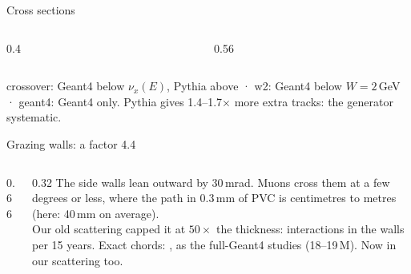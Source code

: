 \documentclass[aspectratio=169,10pt]{beamer}
\newcommand{\sld}[2][\linewidth]{\livewidget{#2}{#1}{0.62cm}}
\newcommand{\legendline}[1]{{\color{muted}\lightfont\scriptsize #1}}
\begin{document}
\begin{frame}{Cross sections}
  \\[1mm]
  \begin{columns}[c]
    \begin{column}{0.4\textwidth}\end{column}
    \begin{column}{0.56\textwidth}\end{column}
  \end{columns}
  \legendline{crossover: Geant4 below $\nu_x(E)$, Pythia above · w2: Geant4 below $W = 2$\,GeV · geant4: Geant4 only. Pythia gives 1.4--1.7$\times$ more extra tracks: the generator systematic.}
\end{frame}

\begin{frame}{Grazing walls: a factor 4.4}
  \begin{columns}[c]
    \begin{column}{0.66\textwidth}
      \\[1mm]
      \sld{sim_w_ang}
    \end{column}
    \begin{column}{0.32\textwidth}\footnotesize
      The side walls lean outward by 30\,mrad. Muons cross them at a few degrees or less, where the path in 0.3\,mm of PVC
      is centimetres to metres (here: 40\,mm on average).\\[1.5mm]
      Our old scattering capped it at $50\times$ the thickness:  interactions in the walls per 15 years. Exact chords:
      , as the full-Geant4 studies (18--19\,M). Now in our scattering too.\\[1.5mm]
    \end{column}
  \end{columns}
\end{frame}
\end{document}

